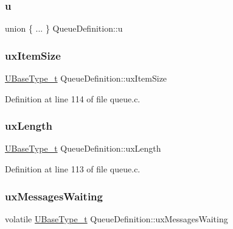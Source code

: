 \subsubsection{\texorpdfstring{u}{u}\hspace{0.1cm}{\footnotesize\ttfamily [3/3]}}
{\footnotesize\ttfamily union \{ ... \}   Queue\+Definition\+::u}

\mbox{\label{struct_queue_definition_a81bb7d3826909244baa9debf5a55abb0}} 
\subsubsection{\texorpdfstring{ux\+Item\+Size}{uxItemSize}}
{\footnotesize\ttfamily \hyperlink{externals_2freertos_2portable_2_g_c_c_2_a_r_m___c_m0_2portmacro_8h_a646f89d4298e4f5afd522202b11cb2e6}{U\+Base\+Type\+\_\+t} Queue\+Definition\+::ux\+Item\+Size}



Definition at line 114 of file queue.\+c.

\mbox{\label{struct_queue_definition_ae80d17a812c669d4d41265b7f693988c}} 
\subsubsection{\texorpdfstring{ux\+Length}{uxLength}}
{\footnotesize\ttfamily \hyperlink{externals_2freertos_2portable_2_g_c_c_2_a_r_m___c_m0_2portmacro_8h_a646f89d4298e4f5afd522202b11cb2e6}{U\+Base\+Type\+\_\+t} Queue\+Definition\+::ux\+Length}



Definition at line 113 of file queue.\+c.

\mbox{\label{struct_queue_definition_a12b07a40152d0f21488ca06d362d13d1}} 
\subsubsection{\texorpdfstring{ux\+Messages\+Waiting}{uxMessagesWaiting}}
{\footnotesize\ttfamily volatile \hyperlink{externals_2freertos_2portable_2_g_c_c_2_a_r_m___c_m0_2portmacro_8h_a646f89d4298e4f5afd522202b11cb2e6}{U\+Base\+Type\+\_\+t} Queue\+Definition\+::ux\+Messages\+Waiting}



